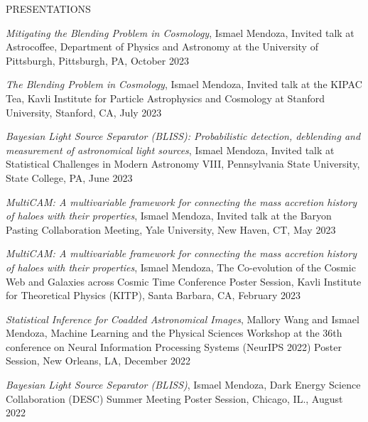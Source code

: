 \documentclass{resume} %
\begin{document}
\begin{rSection}{PRESENTATIONS}
%
\vspace*{-1em}

\item \textit{Mitigating the Blending Problem in Cosmology}, Ismael Mendoza, Invited talk at Astrocoffee, Department of Physics and Astronomy at the University of Pittsburgh, Pittsburgh, PA, October 2023

\item \textit{The Blending Problem in Cosmology}, Ismael Mendoza, Invited talk at the KIPAC Tea, Kavli Institute for Particle Astrophysics and Cosmology at Stanford University, Stanford, CA, July 2023

\item \textit{Bayesian Light Source Separator (BLISS): Probabilistic detection, deblending and measurement of astronomical light sources}, Ismael Mendoza, Invited talk at Statistical Challenges in Modern Astronomy VIII, Pennsylvania State University, State College, PA, June 2023

\item \textit{MultiCAM: A multivariable framework for connecting the mass accretion history of haloes with their properties}, Ismael Mendoza, Invited talk at the Baryon Pasting Collaboration Meeting, Yale University, New Haven, CT, May 2023

\item \textit{MultiCAM: A multivariable framework for connecting the mass accretion history of haloes with their properties}, Ismael Mendoza, The Co-evolution of the Cosmic Web and Galaxies across Cosmic Time Conference Poster Session, Kavli Institute for Theoretical Physics (KITP), Santa Barbara, CA, February 2023

\item \textit{Statistical Inference for Coadded Astronomical Images}, Mallory Wang and Ismael Mendoza, Machine Learning and the Physical Sciences Workshop at the 36th conference on Neural Information Processing Systems (NeurIPS 2022) Poster Session, New Orleans, LA, December 2022

\item \textit{Bayesian Light Source Separator (BLISS)}, Ismael Mendoza, Dark Energy Science Collaboration (DESC) Summer Meeting Poster Session, Chicago, IL., August 2022


\end{rSection}
\end{document}

